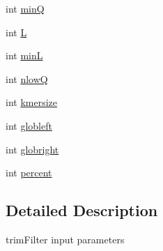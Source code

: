 \begin{DoxyCompactItemize}
\item 
int \hyperlink{struct__iparam__trimFilter_a1e2b69f148d9299815af6ab7f575ad1a}{min\+Q}
\item 
int \hyperlink{struct__iparam__trimFilter_a72fcc236d4136d2405a04f155b515894}{L}
\item 
int \hyperlink{struct__iparam__trimFilter_ac2b43664ca0c95a8572f97254893d675}{min\+L}
\item 
int \hyperlink{struct__iparam__trimFilter_aaeab85398303eada76cb6f32841fa094}{nlow\+Q}
\item 
int \hyperlink{struct__iparam__trimFilter_a6a1118d39cdaa79f48f2d010a6018e5c}{kmersize}
\item 
int \hyperlink{struct__iparam__trimFilter_a2e626c5776d4423d20d5ec7606fe9b81}{globleft}
\item 
int \hyperlink{struct__iparam__trimFilter_ad5fb4ca1786b14cd63a8467187474f51}{globright}
\item 
int \hyperlink{struct__iparam__trimFilter_a8ed026b1de4fccc7288258c3a8faa395}{percent}
\end{DoxyCompactItemize}


\subsection{Detailed Description}
trim\+Filter input parameters 

